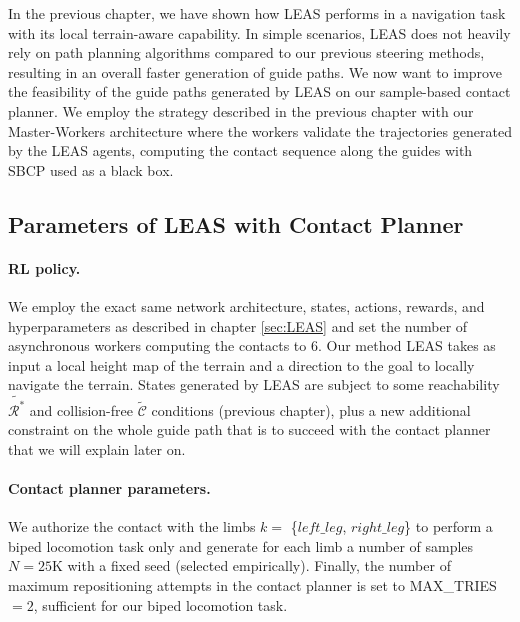 In the previous chapter, we have shown how LEAS performs in a navigation task with its local terrain-aware capability.
In simple scenarios, LEAS does not heavily rely on path planning algorithms compared to our previous steering methods, resulting in an overall faster generation of guide paths.
We now want to improve the feasibility of the guide paths generated by LEAS on our sample-based contact planner.
We employ the strategy described in the previous chapter with our Master-Workers architecture where the workers validate the trajectories generated by the LEAS agents, computing the contact sequence along the guides with SBCP used as a black box.

\subsection{Parameters of LEAS with Contact Planner}
\paragraph{RL policy.}
We employ the exact same network architecture, states, actions, rewards, and hyperparameters as described in chapter \ref{sec:LEAS} and set the number of asynchronous workers computing the contacts to 6.
Our method LEAS takes as input a local height map of the terrain and a direction to the goal to locally navigate the terrain. 
States generated by LEAS are subject to some reachability $\tilde{\mathcal{R}^*}$ and collision-free $\tilde{\mathcal{C}}$ conditions (previous chapter), plus a new additional constraint on the whole guide path that is to succeed with the contact planner that we will explain later on.

\paragraph{Contact planner parameters.}
We authorize the contact with the limbs $k=$ \{$left\_leg$, $right\_leg$\} to perform a biped locomotion task only and generate for each limb a number of samples $N=25$K with a fixed seed (selected empirically). Finally, the number of maximum repositioning attempts in the contact planner is set to MAX\_TRIES $=2$, sufficient for our biped locomotion task.

